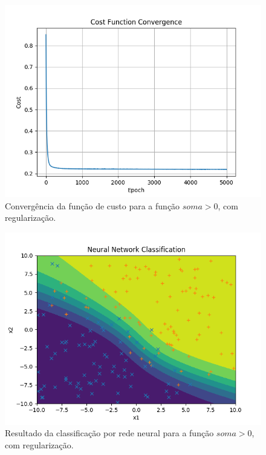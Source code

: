 \documentclass[conference]{IEEEtran}
\begin{document}
\begin{figure}[htbp]
\centering
\centerline{\includegraphics[scale=0.5]{imagens/sum_gt_zero/convergence_sgz.png}}
\caption{Convergência da função de custo para a função $soma > 0$, com regularização.}
\label{sum_gt_zero/convergence_sgz}
\end{figure}

\begin{figure}[htbp]
\centering
\centerline{\includegraphics[scale=0.5]{imagens/sum_gt_zero/nn_classification_sgz.png}}
\caption{Resultado da classificação por rede neural para a função $soma > 0$, com regularização.}
\label{sum_gt_zero/nn_classification_sgz}
\end{figure}
\end{document}
